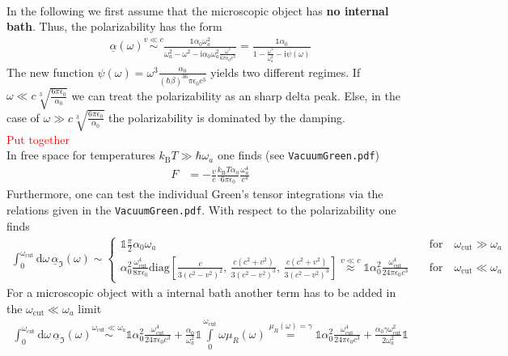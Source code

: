 \documentclass[11pt]{article}
\newcommand{\todo}[1]{\textcolor{red}{#1}}
\newcommand{\ii}[0]{\mathrm{i}}
\newcommand{\dd}[0]{\mathrm{d}}
\begin{document}
\\
In the following we first assume that the microscopic object has \textbf{no internal bath}. Thus, the polarizability has the form
\begin{align}
\underline{\alpha}(\omega)\stackrel{v\ll c}\sim
\frac{\mathbb{1}\alpha_0\omega_a^2}{\omega_a^2-\omega^2 -\ii\alpha_0\omega_a^2\frac{\omega^3}{6\pi\epsilon_0c^3}}
= 
\frac{\mathbb{1}\alpha_0}{1-\frac{\omega^2}{\omega_a^2} -\ii\psi(\omega)}
\end{align}
The new function $\psi(\omega)=\omega^3\frac{\alpha_0}{(\hbar\beta)^36\pi\epsilon_0c^3}$ yields two different regimes. If $\omega\ll c\sqrt[3]{\frac{6\pi\epsilon_0}{\alpha_0}}$ we can treat the polarizability as an sharp delta peak. Else, in the case of $\omega\gg c\sqrt[3]{\frac{6\pi\epsilon_0}{\alpha_0}}$ the polarizability is dominated by the damping.
\todo{\\ Put together \\}In free space for temperatures $k_\mathrm{B}T\gg \hbar\omega_a$ one finds (see \texttt{VacuumGreen.pdf})
\begin{align}
F &= -\frac{v}{c} \frac{k_\mathrm{B}T \alpha_0}{6\pi\epsilon_0} \frac{\omega_a^4}{c^4}
\end{align}
Furthermore, one can test the individual Green's tensor integrations via the relations given in the \texttt{VacuumGreen.pdf}. With respect to the polarizability one finds
\begin{align}
\int_0^{\omega_\mathrm{cut}}\dd\omega\,\underline{\alpha}_\Im(\omega)
\sim
\begin{cases}
\mathbb{1}\frac{\pi}{2}\alpha_0\omega_a
\quad  & \text{for}\quad \omega_\mathrm{cut}\gg \omega_a
\\
\alpha_0^2
  \frac{\omega_\mathrm{cut}^4}{8\pi\epsilon_0}\mathrm{diag}\left[
  \frac{ c }{3 \left(c^2-v^2\right)^2}
    ,\,
    \frac{ c  \left(c^2+v^2\right)}{3 \left(c^2-v^2\right)^3}
  ,\,
\frac{ c  \left(c^2+v^2\right)}{3 \left(c^2-v^2\right)^3}
\right]
\stackrel{v\ll c}\approx
\mathbb{1}\alpha_0^2 \frac{\omega_\mathrm{cut}^4}{24\pi\epsilon_0 c^3}
\quad  &\text{for}\quad \omega_\mathrm{cut}\ll \omega_a
\end{cases}
\end{align}
For a microscopic object with a internal bath another term has to be added in the $\omega_\mathrm{cut} \ll \omega_a$ limit
\begin{align}
\int_0^{\omega_\mathrm{cut}}\dd\omega\,\underline{\alpha}_\Im(\omega)
\stackrel{\omega_\mathrm{cut}\ll\omega_a}\sim
\mathbb{1}\alpha_0^2 \frac{\omega_\mathrm{cut}^4}{24\pi\epsilon_0 c^3}
+ \frac{\alpha_0}{\omega_a^2}\mathbb{1}\int\limits_0^{\omega_\mathrm{cut}} \omega\mu_R(\omega)
\stackrel{\mu_R(\omega)=\gamma}=
\mathbb{1}\alpha_0^2 \frac{\omega_\mathrm{cut}^4}{24\pi\epsilon_0 c^3}
+ \frac{\alpha_0\gamma\omega_\mathrm{cut}^2}{2\omega_a^2}\mathbb{1}
\end{align}
\end{document}
